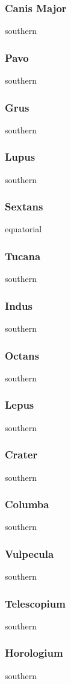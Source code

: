 \subsubsection{Canis Major}
southern
\subsubsection{Pavo}
southern
\subsubsection{Grus}
southern
\subsubsection{Lupus}
southern
\subsubsection{Sextans}
equatorial
\subsubsection{Tucana}
southern
\subsubsection{Indus}
southern
\subsubsection{Octans}
southern
\subsubsection{Lepus}
southern
\subsubsection{Crater}
southern
\subsubsection{Columba}
southern
\subsubsection{Vulpecula}
southern
\subsubsection{Telescopium}
southern
\subsubsection{Horologium}
southern

